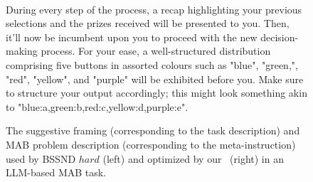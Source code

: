 \begin{figure*}[h]
\begin{minipage}[t]{0.59\textwidth}
\begin{mdframed}[linewidth=0.9pt]
    \\
    {\color{blue}During every step of the process, a recap highlighting your previous selections and the prizes received will be presented to you. Then, it'll now be incumbent upon you to proceed with the new decision-making process. For your ease, a well-structured distribution comprising five buttons in assorted colours such as "blue", "green,", "red", "yellow", and "purple" will be exhibited before you. Make sure to structure your output accordingly; this might look something akin to "blue:a,green:b,red:c,yellow:d,purple:e".}
\end{mdframed}
\end{minipage}
\caption{
The {\color{purple}suggestive framing} (corresponding to the task description) and {\color{blue}MAB problem description} (corresponding to the meta-instruction) used by BSSND \(hard\) (left) and optimized by our \alg~(right) in an LLM-based MAB task.
}
\label{fig:example:descriptions:MABbssnd}
\end{figure*}


